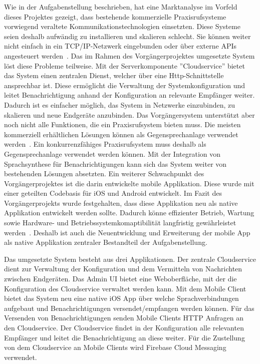 Wie in der Aufgabenstellung beschrieben, hat eine Marktanalyse im Vorfeld dieses Projektes gezeigt, dass bestehende kommerzielle Praxisrufsysteme vorwiegend veraltete Kommunikationstechnologien einsetzten.
Diese Systeme seien deshalb aufwändig zu installieren und skalieren schlecht.
Sie können weiter nicht einfach in ein TCP/IP-Netzwerk eingebunden oder über externe APIs angesteuert werden~\cite{aufgabenstellung}.
Das im Rahmen des Vorgängerprojektes umgesetzte System löst diese Probleme teilweise.
Mit der Serverkomponente ''Cloudservice'' bietet das System einen zentralen Dienst, welcher über eine Http-Schnittstelle ansprechbar ist.
Diese ermöglicht die Verwaltung der Systemkonfiguration und leitet Benachrichtigung anhand der Konfiguration an relevante Empfänger weiter.
Dadurch ist es einfacher möglich, das System in Netzwerke einzubinden, zu skalieren und neue Endgeräte anzubinden.
Das Vorgängersystem unterstützt aber noch nicht alle Funktionen, die ein Praxisrufsystem bieten muss.
Die meisten kommerziell erhältlichen Lösungen können als Gegensprechanlage verwendet werden~\cite{aufgabenstellung}.
Ein konkurrenzfähiges Praxisrufsystem muss deshalb als Gegensprechanlage verwendet werden können.
Mit der Integration von Sprachsynthese für Benachrichtigungen kann sich das System weiter von bestehenden Lösungen absetzten.
Ein weiterer Schwachpunkt des Vorgängerprojektes ist die darin entwickelte mobile Applikation.
Diese wurde mit einer geteilten Codebasis für iOS und Android entwickelt.
Im Fazit des Vorgängerprojekts wurde festgehalten, dass diese Applikation neu als native Applikation entwickelt werden sollte.
Dadurch könne effizienter Betrieb, Wartung sowie Hardware- und Betriebssystemkomaptibilität langfristig gewährleistet werden~\cite{ip5}.
Deshalb ist auch die Neuentwicklung und Erweiterung der mobile App als native Applikation zentraler Bestandteil der Aufgabenstellung.

Das umgesetzte System besteht aus drei Applikationen.
Der zentrale Cloudservice dient zur Verwaltung der Konfiguration und dem Vermitteln von Nachrichten zwischen Endgeräten.
Das Admin UI bietet eine Weboberfläche, mit der die Konfiguration des Cloudservice verwaltet werden kann.
Mit dem Mobile Client bietet das System neu eine native iOS App über welche Sprachverbindungen aufgebaut und Benachrichtigungen versendet/empfangen werden können.
Für das Versenden von Benachrichtigungen senden Mobile Clients HTTP Anfragen an den Cloudservice.
Der Cloudservice findet in der Konfiguration alle relevanten Empfänger und leitet die Benachrichtigung an diese weiter.
Für die Zustellung von dem Cloudservice an Mobile Clients wird Firebase Cloud Messaging verwendet.

